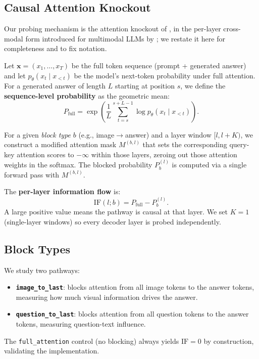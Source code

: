 \subsection{Causal Attention Knockout}

Our probing mechanism is the attention knockout of \citet{geva2023dissecting}, in the
per-layer cross-modal form introduced for multimodal LLMs by
\citet{zhang2025crossmodal}; we restate it here for completeness and to fix notation.

Let $\mathbf{x} = (x_1, \dots, x_T)$ be the full token sequence (prompt + generated
answer) and let $p_\theta(x_t \mid x_{<t})$ be the model's next-token probability
under full attention. For a generated answer of length $L$ starting at position $s$,
we define the \textbf{sequence-level probability} as the geometric mean:
\[
  P_\text{full} = \exp\!\left(\frac{1}{L}\sum_{t=s}^{s+L-1} \log p_\theta(x_t \mid x_{<t})\right).
\]

For a given \emph{block type} $b$ (e.g., image$\to$answer) and a layer window
$[l, l+K)$, we construct a modified attention mask $M^{(b,l)}$ that sets the
corresponding query-key attention scores to $-\infty$ within those layers, zeroing
out those attention weights in the softmax. The blocked probability $P_b^{(l)}$ is
computed via a single forward pass with $M^{(b,l)}$.

The \textbf{per-layer information flow} is:
\[
  \text{IF}(l; b) = P_\text{full} - P_b^{(l)}.
\]
A large positive value means the pathway is causal at that layer. We set $K=1$
(single-layer windows) so every decoder layer is probed independently.

\subsection{Block Types}

We study two pathways:
\begin{itemize}
  \item \textbf{\texttt{image\_to\_last}}: blocks attention from all image tokens to
        the answer tokens, measuring how much visual information drives the answer.
  \item \textbf{\texttt{question\_to\_last}}: blocks attention from all question
        tokens to the answer tokens, measuring question-text influence.
\end{itemize}
The \texttt{full\_attention} control (no blocking) always yields $\text{IF}=0$ by
construction, validating the implementation.

